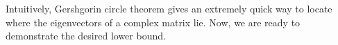 \documentclass{article}
\begin{document}
\noindent Intuitively, Gershgorin circle theorem gives an extremely quick way to locate where the eigenvectors of a complex matrix lie.
Now, we are ready to demonstrate the desired lower bound.

\end{document}
